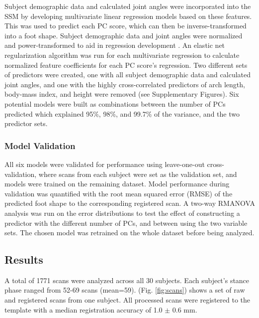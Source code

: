 \documentclass[defaultstyle,11pt]{comps}
\begin{document}
Subject demographic data and calculated joint angles were incorporated into the SSM by developing multivariate linear regression models based on these features.
This was used to predict each PC score, which can then be inverse-transformed into a foot shape.
Subject demographic data and joint angles were normalized and power-transformed to aid in regression development \citep{Yeo2000}.
An elastic net regularization algorithm \citep{Zou2005} was run for each multivariate regression to calculate normalized feature coefficients for each PC score's regression.
Two different sets of predictors were created, one with all subject demographic data and calculated joint angles, and one with the highly cross-correlated predictors of arch length, body-mass index, and height were removed (see Supplementary Figures).
Six potential models were built as combinations between the number of PCs predicted which explained 95\%, 98\%, and 99.7\% of the variance, and the two predictor sets.

\hypertarget{model-validation}{%
\subsubsection{Model Validation}\label{model-validation}}

All six models were validated for performance using leave-one-out cross-validation, where scans from each subject were set as the validation set, and models were trained on the remaining dataset.
Model performance during validation was quantified with the root mean squared error (RMSE) of the predicted foot shape to the corresponding registered scan.
A two-way RMANOVA analysis was run on the error distributions to test the effect of constructing a predictor with the different number of PCs, and between using the two variable sets.
The chosen model was retrained on the whole dataset before being analyzed.

\hypertarget{results-1}{%
\subsection{Results}\label{results-1}}

A total of 1771 scans were analyzed across all 30 subjects.
Each subject's stance phase ranged from 52-69 scans (mean=59).
(Fig. \ref{fig:scans}) shows a set of raw and registered scans from one subject.
All processed scans were registered to the template with a median registration accuracy of 1.0 \(\pm\) 0.6 mm.
\end{document}
